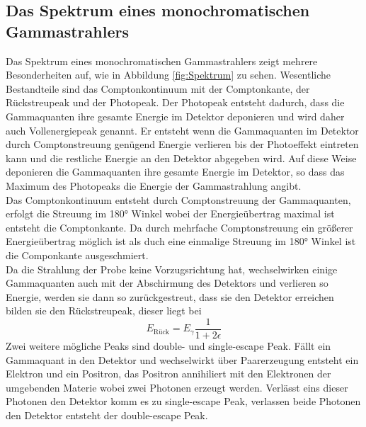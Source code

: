 \subsection{Das Spektrum eines monochromatischen Gammastrahlers}
Das Spektrum eines monochromatischen Gammastrahlers zeigt mehrere Besonderheiten auf, wie in Abbildung \ref{fig:Spektrum} zu
sehen. Wesentliche Bestandteile sind das Comptonkontinuum mit der Comptonkante, der Rückstreupeak
und der Photopeak. Der Photopeak entsteht dadurch, dass die Gammaquanten ihre gesamte Energie im Detektor deponieren
und wird daher auch Vollenergiepeak genannt. Er entsteht wenn die Gammaquanten im Detektor durch
Comptonstreuung genügend Energie verlieren bis der Photoeffekt eintreten kann und die restliche Energie
an den Detektor abgegeben wird. Auf diese Weise deponieren die Gammaquanten ihre gesamte Energie im
Detektor, so dass das Maximum des Photopeaks die Energie der Gammastrahlung angibt.\\
Das Comptonkontinuum entsteht durch Comptonstreuung der Gammaquanten, erfolgt die Streuung im
180° Winkel wobei der Energieübertrag maximal ist entsteht die Comptonkante. Da durch mehrfache
Comptonstreuung ein größerer Energieübertrag möglich ist als duch eine einmalige Streuung im 180° Winkel ist die
Componkante ausgeschmiert.\\
Da die Strahlung der Probe keine Vorzugsrichtung hat, wechselwirken einige Gammaquanten auch mit der
Abschirmung des Detektors und verlieren so Energie, werden sie dann so zurückgestreut, dass sie den
Detektor erreichen bilden sie den Rückstreupeak, dieser liegt bei
\begin{equation}
  E_{\text{Rück}}=E_{\gamma}\frac{1}{1+2\epsilon}
  \label{eqn:Rückstreu}
\end{equation}
Zwei weitere mögliche Peaks sind double- und single-escape Peak. Fällt ein Gammaquant in den Detektor und wechselwirkt über
Paarerzeugung entsteht ein Elektron und ein Positron, das Positron annihiliert mit den Elektronen der umgebenden Materie wobei
zwei Photonen erzeugt werden. Verlässt eins dieser Photonen den Detektor komm es zu single-escape Peak, verlassen beide
Photonen den Detektor entsteht der double-escape Peak.
\cite{Gilmore2}



